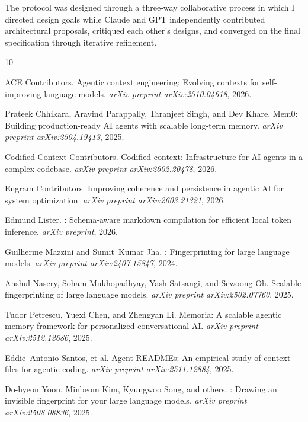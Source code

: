 \documentclass[11pt,a4paper]{article}
\begin{document}
The protocol was designed through a three-way collaborative process in which I directed design goals while Claude and GPT independently contributed architectural proposals, critiqued each other's designs, and converged on the final specification through iterative refinement.



\begin{thebibliography}{10}

ACE Contributors.
\newblock Agentic context engineering: Evolving contexts for self-improving language models.
\newblock \textit{arXiv preprint arXiv:2510.04618}, 2026.

Prateek Chhikara, Aravind Parappally, Taranjeet Singh, and Dev Khare.
\newblock Mem0: Building production-ready {AI} agents with scalable long-term memory.
\newblock \textit{arXiv preprint arXiv:2504.19413}, 2025.

Codified Context Contributors.
\newblock Codified context: Infrastructure for {AI} agents in a complex codebase.
\newblock \textit{arXiv preprint arXiv:2602.20478}, 2026.

Engram Contributors.
\newblock Improving coherence and persistence in agentic {AI} for system optimization.
\newblock \textit{arXiv preprint arXiv:2603.21321}, 2026.

Edmund Lister.
: Schema-aware markdown compilation for efficient local token inference.
\newblock \textit{arXiv preprint}, 2026.

Guilherme Mazzini and Sumit~Kumar Jha.
: Fingerprinting for large language models.
\newblock \textit{arXiv preprint arXiv:2407.15847}, 2024.

Anshul Nasery, Soham Mukhopadhyay, Yash Satsangi, and Sewoong Oh.
\newblock Scalable fingerprinting of large language models.
\newblock \textit{arXiv preprint arXiv:2502.07760}, 2025.

Tudor Petrescu, Yuexi Chen, and Zhengyan Li.
\newblock Memoria: A scalable agentic memory framework for personalized conversational {AI}.
\newblock \textit{arXiv preprint arXiv:2512.12686}, 2025.

Eddie~Antonio Santos, et al.
\newblock Agent {READMEs}: An empirical study of context files for agentic coding.
\newblock \textit{arXiv preprint arXiv:2511.12884}, 2025.

Do-hyeon Yoon, Minbeom Kim, Kyungwoo Song, and others.
: Drawing an invisible fingerprint for your large language models.
\newblock \textit{arXiv preprint arXiv:2508.08836}, 2025.

\end{thebibliography}
\end{document}
